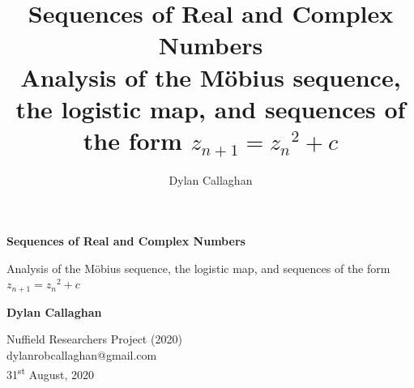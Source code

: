 \documentclass[12pt]{article}
\title{%
	Sequences of Real and Complex Numbers \\
	\small Analysis of the Möbius sequence, the logistic map, and sequences of the form $z_{n+1}={z_n}^2+c$}
\author{Dylan Callaghan}
\begin{document}

	\begin{titlepage}
		\begin{center}
			\vspace*{1cm}
			
			\Huge
			\textbf{Sequences of Real and Complex Numbers}
			
			\vspace{0.5cm}
			\normalsize
			Analysis of the Möbius sequence, the logistic map, and sequences of the form $z_{n+1}={z_n}^2+c$
			
			\vspace{1.5cm}
			
			\textbf{Dylan Callaghan}
			
			\vfill
			
			
			\vspace{0.8cm}
			
			\normalsize
			Nuffield Researchers Project (2020)\\
			dylanrobcallaghan@gmail.com\\
			31\textsuperscript{st} August, 2020
			
		\end{center}
	\end{titlepage}

\newpage
\tableofcontents
\newpage
\end{document}
